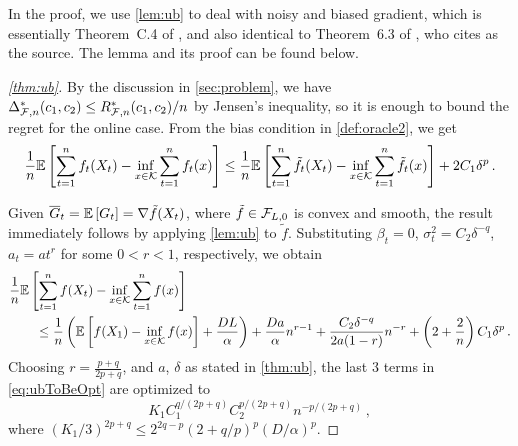 In the proof, we use \cref{lem:ub} to deal with noisy and biased gradient, which is essentially Theorem~C.4 of \cite{MahdaviPhd:2014}, and also identical to Theorem~6.3 of \cite{Bu:Convex14}, who cites \cite{Dekel:minibatch12} as the source.
The lemma and its proof can be found below.

\begin{proof}[\cref{thm:ub}]
By the discussion in \cref{sec:problem}, we have $\Delta^*_{\mathcal{F},n}(c_1,c_2) \le R^*_{\mathcal{F},n}(c_1,c_2)/n$ by Jensen's inequality, so it is enough to bound the regret for the online case.
From the bias condition in \cref{def:oracle2}, we get
\begin{align*}
 \frac{1}{n} \mathbb{E}\left[ \sum_{t=1}^n f_t(X_t) - \inf_{x \in \mathcal{K}}\sum_{t=1}^n f_t(x) \right]
 \le \frac{1}{n}\mathbb{E}\left[ \sum_{t=1}^n \tilde{f}_t(X_t) - \inf_{x \in \mathcal{K}}\sum_{t=1}^n \tilde{f}_t(x) \right] +2C_1 \delta^p
 \,.
\end{align*}

Given $\overline{G}_t=\mathbb{E}\left[G_t\right] = \nabla \tilde{f}(X_t)$, where $\tilde{f}\in \mathcal{F}_{L,0}$ is convex and smooth,
the result immediately follows by applying \cref{lem:ub} to $\tilde{f}$.
Substituting
 $\beta_t = 0$, $\sigma^2_t = C_2 \delta^{-q}$, $a_t=a t^r$ for some $0<r<1$, respectively, we obtain
 \begin{align}
\MoveEqLeft
\frac{1}{n} \EE{ \sum_{t=1}^n f( X_t) - \inf_{x \in \cK} \sum_{t=1}^n f(x)} \nonumber \\
&\le \frac{1}{n}\left(\EE{f(X_1)-\inf_{x \in \cK}f(x)}+\frac{DL}{\alpha}  \right) %
+\frac{Da}{\alpha} n^{r-1}+\dfrac{C_2 \delta^{-q}}{2a(1-r)}n^{-r}+ \left(2+\dfrac{2}{n}\right)C_1\delta^p \,.
\label{eq:ubToBeOpt}
 \end{align}
 Choosing $r = \frac{p+q}{2p+q}$, and $a$, $\delta$ as stated in \cref{thm:ub}, the last $3$ terms in \eqref{eq:ubToBeOpt} are optimized to
 \[
 K_1 C_1^{q/(2p+q)} C_2^{p/(2p+q)} n ^{-p/(2p+q)} \,,
 \]
 where
 $(K_1/3)^{2p+q} \le 2^{2q-p}\left(2+q/p \right)^p \left(D/\alpha\right)^{p}$.


\end{proof}
